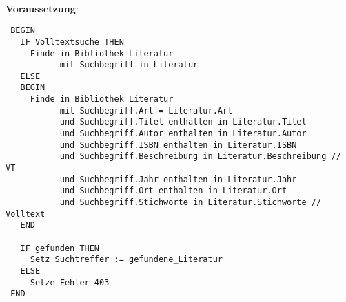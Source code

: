\hrulefill\\
\textbf{Voraussetzung}: -
\begin{verbatim}
 BEGIN
   IF Volltextsuche THEN
     Finde in Bibliothek Literatur
           mit Suchbegriff in Literatur
   ELSE
   BEGIN
     Finde in Bibliothek Literatur
           mit Suchbegriff.Art = Literatur.Art
           und Suchbegriff.Titel enthalten in Literatur.Titel
           und Suchbegriff.Autor enthalten in Literatur.Autor
           und Suchbegriff.ISBN enthalten in Literatur.ISBN
           und Suchbegriff.Beschreibung in Literatur.Beschreibung // VT
           und Suchbegriff.Jahr enthalten in Literatur.Jahr
           und Suchbegriff.Ort enthalten in Literatur.Ort
           und Suchbegriff.Stichworte in Literatur.Stichworte // Volltext
   END
   
   IF gefunden THEN
     Setz Suchtreffer := gefundene_Literatur
   ELSE
     Setze Fehler 403
 END
\end{verbatim}
\hrulefill